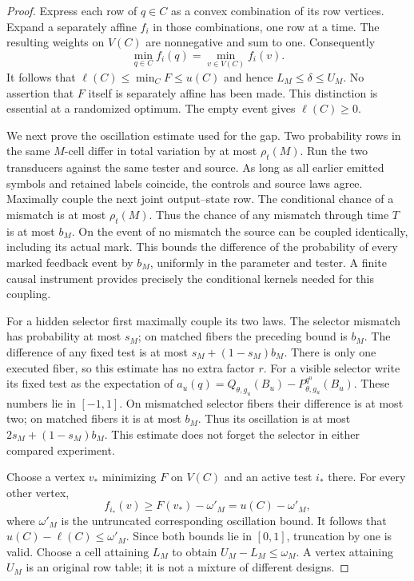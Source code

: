 \begin{proof}
Express each row of $q\in C$ as a convex combination of its row vertices.
Expand a separately affine $f_i$ in those combinations, one row at a
time. The resulting weights on $V(C)$ are nonnegative and sum to one.
Consequently
\begin{equation}\label{eq:v14-vertex}
 \min_{q\in C}f_i(q)=\min_{v\in V(C)}f_i(v).
\end{equation}
It follows that $\ell(C)\le\min_C F\le u(C)$ and hence
$L_M\le\delta\le U_M$. No assertion that $F$ itself is separately affine
has been made. This distinction is essential at a randomized optimum.
The empty event gives $\ell(C)\ge0$.

We next prove the oscillation estimate used for the gap. Two probability
rows in the same $M$-cell differ in total variation by at most
$\rho_t(M)$. Run the two transducers against the same tester and source.
As long as all earlier emitted symbols and retained labels coincide,
the controls and source laws agree. Maximally couple the next joint
output--state row. The conditional chance of a mismatch is at most
$\rho_t(M)$. Thus the chance of any mismatch through time $T$ is at most
$b_M$. On the event of no mismatch the source can be coupled identically,
including its actual mark. This bounds the difference of the probability
of every marked feedback event by $b_M$, uniformly in the parameter and
tester. A finite causal instrument provides precisely the conditional
kernels needed for this coupling.

For a hidden selector first maximally couple its two laws. The selector
mismatch has probability at most $s_M$; on matched fibers the preceding
bound is $b_M$. The difference of any fixed test is at most
$s_M+(1-s_M)b_M$. There is only one executed fiber, so this estimate has
no extra factor $r$. For a visible selector write its fixed test as the
expectation of $a_u(q)=Q_{\theta,g_u}(B_u)-P^{q^u}_{\theta,g_u}(B_u)$.
These numbers lie in $[-1,1]$. On mismatched selector fibers their
difference is at most two; on matched fibers it is at most $b_M$.
Thus its oscillation is at most $2s_M+(1-s_M)b_M$. This estimate does not
forget the selector in either compared experiment.

Choose a vertex $v_*$ minimizing $F$ on $V(C)$ and an active test $i_*$
there. For every other vertex,
\[
 f_{i_*}(v)\ge F(v_*)-\omega'_M=u(C)-\omega'_M,
\]
where $\omega'_M$ is the untruncated corresponding oscillation bound.
It follows that $u(C)-\ell(C)\le\omega'_M$. Since both bounds lie in
$[0,1]$, truncation by one is valid. Choose a cell attaining $L_M$ to
obtain $U_M-L_M\le\omega_M$. A vertex attaining $U_M$ is an original
row table; it is not a mixture of different designs.


\end{proof}
